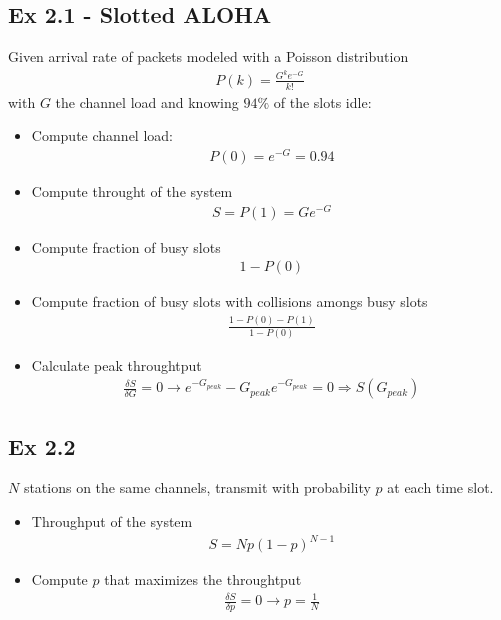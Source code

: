 \subsection*{Ex 2.1 - Slotted ALOHA}
Given arrival rate of packets modeled with a Poisson distribution
\begin{align*}
	P(k) = \frac{G^k e^{-G}}{k!}
\end{align*}
with $G$ the channel load and knowing $94\%$ of the slots idle:
\begin{itemize}
	\item Compute channel load: 
	\begin{align*}
		P(0) = e^{-G} = 0.94
	\end{align*}
	\item Compute throught of the system
	\begin{align*}
		S = P(1) = G e^{-G }
	\end{align*}
	\item Compute fraction of busy slots
	\begin{align*}
		1 - P(0)
	\end{align*}
	\item Compute fraction of busy slots with collisions amongs busy slots
	\begin{align*}
		\frac{1 - P(0) - P(1)}{1 - P(0)}
	\end{align*}
	\item Calculate peak throughtput
	\begin{align*}
		\frac{\delta S}{\delta G} = 0 \rightarrow e^{-G_{peak}} - G_{peak} e^{-G_{peak}} = 0  \Rightarrow S(G_{peak})
	\end{align*}
\end{itemize}

\subsection*{Ex 2.2}
$N$ stations on the same channels, transmit with probability $p$ at each time slot.
\begin{itemize}
	\item Throughput of the system
	\begin{align*}
		S = N p(1-p)^{N-1}
	\end{align*}
	\item Compute $p$ that maximizes the throughtput
	\begin{align*}
		\frac{\delta S}{\delta p} = 0 \rightarrow p = \frac{1}{N}
	\end{align*}
\end{itemize}

